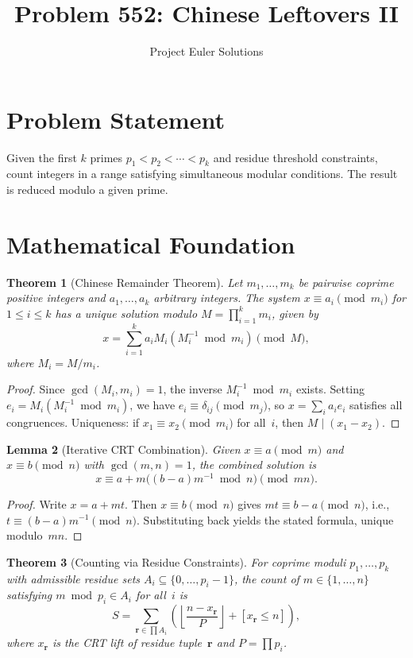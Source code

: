 \documentclass[11pt]{article}
\title{Problem 552: Chinese Leftovers II}
\author{Project Euler Solutions}
\date{}
\newtheorem{theorem}{Theorem}
\newtheorem{lemma}[theorem]{Lemma}
\begin{document}
\maketitle

\section{Problem Statement}

Given the first $k$ primes $p_1 < p_2 < \cdots < p_k$ and residue threshold constraints, count integers in a range satisfying simultaneous modular conditions. The result is reduced modulo a given prime.

\section{Mathematical Foundation}

\begin{theorem}[Chinese Remainder Theorem]
Let $m_1, \ldots, m_k$ be pairwise coprime positive integers and $a_1, \ldots, a_k$ arbitrary integers. The system $x \equiv a_i \pmod{m_i}$ for $1 \leq i \leq k$ has a unique solution modulo $M = \prod_{i=1}^k m_i$, given by
\[
x = \sum_{i=1}^{k} a_i M_i (M_i^{-1} \bmod m_i) \pmod{M},
\]
where $M_i = M / m_i$.
\end{theorem}

\begin{proof}
Since $\gcd(M_i, m_i) = 1$, the inverse $M_i^{-1} \bmod m_i$ exists. Setting $e_i = M_i (M_i^{-1} \bmod m_i)$, we have $e_i \equiv \delta_{ij} \pmod{m_j}$, so $x = \sum_i a_i e_i$ satisfies all congruences. Uniqueness: if $x_1 \equiv x_2 \pmod{m_i}$ for all~$i$, then $M \mid (x_1 - x_2)$.
\end{proof}

\begin{lemma}[Iterative CRT Combination]
Given $x \equiv a \pmod{m}$ and $x \equiv b \pmod{n}$ with $\gcd(m,n) = 1$, the combined solution is
\[
x \equiv a + m \bigl((b-a) m^{-1} \bmod n\bigr) \pmod{mn}.
\]
\end{lemma}

\begin{proof}
Write $x = a + mt$. Then $x \equiv b \pmod{n}$ gives $mt \equiv b - a \pmod{n}$, i.e., $t \equiv (b-a)m^{-1} \pmod{n}$. Substituting back yields the stated formula, unique modulo~$mn$.
\end{proof}

\begin{theorem}[Counting via Residue Constraints]
For coprime moduli $p_1, \ldots, p_k$ with admissible residue sets $A_i \subseteq \{0, \ldots, p_i - 1\}$, the count of $m \in \{1, \ldots, n\}$ satisfying $m \bmod p_i \in A_i$ for all~$i$ is
\[
S = \sum_{\mathbf{r} \in \prod A_i} \left(\left\lfloor \frac{n - x_{\mathbf{r}}}{P} \right\rfloor + [x_{\mathbf{r}} \leq n]\right),
\]
where $x_{\mathbf{r}}$ is the CRT lift of residue tuple~$\mathbf{r}$ and $P = \prod p_i$.
\end{theorem}
\end{document}
